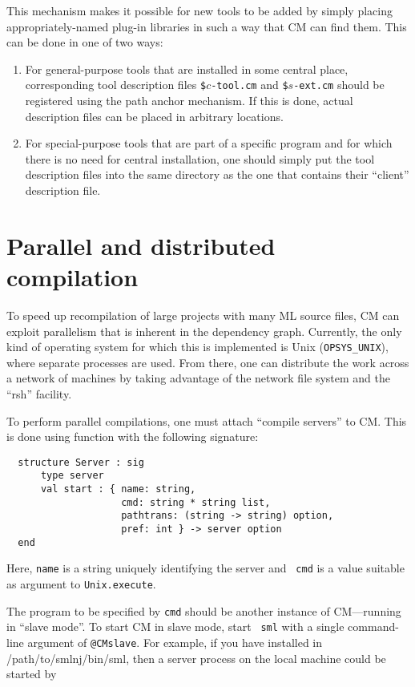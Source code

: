 \documentclass[titlepage,letterpaper]{article}
\begin{document}
This mechanism makes it possible for new tools to be added by simply
placing appropriately-named plug-in libraries in such a way that CM
can find them.  This can be done in one of two ways:

\begin{enumerate}
\item For general-purpose tools that are installed in some central
place, corresponding tool description files {\tt \$}$c${\tt -tool.cm}
and {\tt \$}$s${\tt -ext.cm} should be registered using the path
anchor mechanism.  If this is done, actual description files can be
placed in arbitrary locations.
\item For special-purpose tools that are part of a specific program
and for which there is no need for central installation, one should
simply put the tool description files into the same directory as the
one that contains their ``client'' description file.
\end{enumerate}

\section{Parallel and distributed compilation}
\label{sec:parmake}

To speed up recompilation of large projects with many ML source files,
CM can exploit parallelism that is inherent in the dependency graph.
Currently, the only kind of operating system for which this is
implemented is Unix ({\tt OPSYS\_UNIX}), where separate processes are
used.  From there, one can distribute the work across a network of
machines by taking advantage of the network file system and the
``rsh'' facility.

To perform parallel compilations, one must attach ``compile servers''
to CM.  This is done using function
with the following signature:

\begin{verbatim}
  structure Server : sig
      type server
      val start : { name: string,
                    cmd: string * string list,
                    pathtrans: (string -> string) option,
                    pref: int } -> server option
  end
\end{verbatim}

Here, {\tt name} is a string uniquely identifying the server and {\tt
cmd} is a value suitable as argument to {\tt Unix.execute}.

The program to be specified by {\tt cmd} should be another instance of
CM---running in ``slave mode''.  To start CM in slave mode, start {\tt
sml} with a single command-line argument of {\tt @CMslave}.  For
example, if you have installed in /path/to/smlnj/bin/sml, then a
server process on the local machine could be started by
\end{document}
